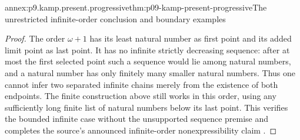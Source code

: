 \begin{annexitem}{annex:p9.kamp.present.progressive}{thm:p09-kamp-present-progressive}{The unrestricted infinite-order conclusion and boundary examples}
\begin{proof}
The order \(\omega+1\) has
its least natural number as
first point and its added
limit point as last point.
It has no infinite strictly
decreasing sequence: after
at most the first selected
point such a sequence would
lie among natural numbers,
and a natural number has
only finitely many smaller
natural numbers. Thus one
cannot infer two separated
infinite chains merely from
the existence of both
endpoints. The finite
construction above still
works in this order, using
any sufficiently long finite
list of natural numbers
below its last point. This
verifies the bounded infinite
case without the unsupported
sequence premise and completes
the source's announced
infinite-order nonexpressibility
claim
\cite[pp.~19, 112--117]{Kamp1968}.
\end{proof}
\end{annexitem}
